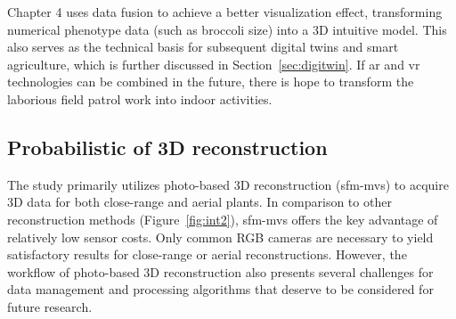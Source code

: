   Chapter 4 uses data fusion to achieve a better visualization effect, 
  transforming numerical phenotype data (such as broccoli size) into a 3D intuitive model. 
  This also serves as the technical basis for subsequent digital twins and smart agriculture, which is further discussed in Section~\ref{sec:digitwin}. 
  If \gls{ar} and \gls{vr} technologies can be combined in the future, 
  there is hope to transform the laborious field patrol work into indoor activities. 



\subsection{Probabilistic of 3D reconstruction}


  The study primarily utilizes photo-based 3D reconstruction (\mbox{\gls{sfm}-\gls{mvs}}) to acquire 3D data for both close-range and aerial plants. 
  In comparison to other reconstruction methods (Figure~\ref{fig:int2}), \mbox{\gls{sfm}-\gls{mvs}} offers the key advantage of relatively low sensor costs. 
  Only common RGB cameras are necessary to yield satisfactory results for close-range or aerial reconstructions.
  However, the workflow of photo-based 3D reconstruction also presents several challenges for data management and processing algorithms that deserve to be considered for future research.



